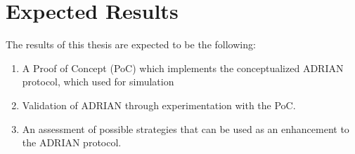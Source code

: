 \section{Expected Results} \label{sec:expected-results}
The results of this thesis are expected to be the following: 

\begin{enumerate}
    \item A Proof of Concept (PoC) which implements the conceptualized ADRIAN protocol, which used for simulation 
    \item Validation of ADRIAN through experimentation with the PoC.
    \item An assessment of possible strategies that can be used as an enhancement to the ADRIAN protocol.
\end{enumerate}